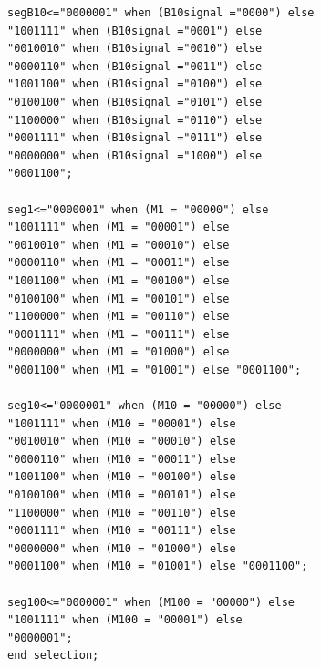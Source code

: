 \begin{enumerate}
\begin{lstlisting}[caption={To-input BCD adder med 3-cifret output},label={lst:TwoInputBCDAdder3Output}]
segB10<="0000001" when (B10signal ="0000") else
"1001111" when (B10signal ="0001") else
"0010010" when (B10signal ="0010") else
"0000110" when (B10signal ="0011") else
"1001100" when (B10signal ="0100") else
"0100100" when (B10signal ="0101") else
"1100000" when (B10signal ="0110") else
"0001111" when (B10signal ="0111") else
"0000000" when (B10signal ="1000") else
"0001100";

seg1<="0000001" when (M1 = "00000") else
"1001111" when (M1 = "00001") else
"0010010" when (M1 = "00010") else
"0000110" when (M1 = "00011") else
"1001100" when (M1 = "00100") else
"0100100" when (M1 = "00101") else
"1100000" when (M1 = "00110") else
"0001111" when (M1 = "00111") else
"0000000" when (M1 = "01000") else
"0001100" when (M1 = "01001") else "0001100";

seg10<="0000001" when (M10 = "00000") else
"1001111" when (M10 = "00001") else
"0010010" when (M10 = "00010") else
"0000110" when (M10 = "00011") else
"1001100" when (M10 = "00100") else
"0100100" when (M10 = "00101") else
"1100000" when (M10 = "00110") else
"0001111" when (M10 = "00111") else
"0000000" when (M10 = "01000") else
"0001100" when (M10 = "01001") else "0001100";

seg100<="0000001" when (M100 = "00000") else
"1001111" when (M100 = "00001") else
"0000001";
end selection;
		\end{lstlisting}


\end{enumerate}
